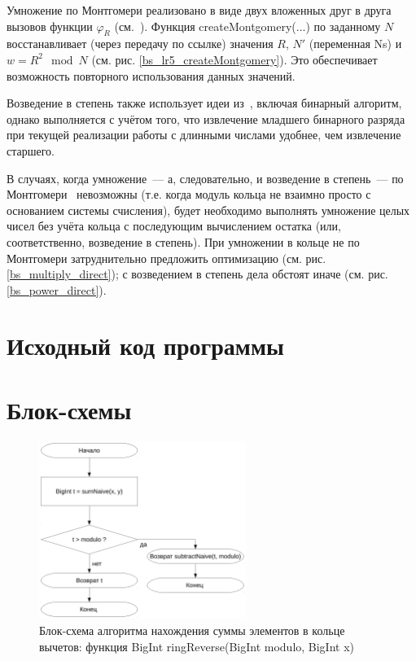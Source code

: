 \documentclass[a4paper,12pt]{article} %
\begin{document}
Умножение по Монтгомери реализовано в виде двух вложенных друг в друга вызовов функции $\varphi_R$
(см.~\cite{Glukhov}).
Функция createMontgomery(...) по заданному $N$
восстанавливает (через передачу по ссылке) значения $R$, $N'$ (переменная Ns) и $w = R^2 \mod N$
(см. рис. \ref{bs_lr5_createMontgomery}).
Это обеспечивает возможность повторного использования данных значений.

Возведение в степень также использует идеи из~\cite{Glukhov},
включая бинарный алгоритм, однако выполняется с учётом того,
что извлечение младшего бинарного разряда при текущей реализации
работы с длинными числами удобнее, чем извлечение старшего.

В случаях, когда умножение~--- а, следовательно, и возведение в степень~--- по Монтгомери~\cite{Glukhov}
невозможны (т.е. когда модуль кольца не взаимно просто с основанием системы счисления),
будет необходимо выполнять умножение целых чисел без учёта кольца с последующим вычислением остатка
(или, соответственно, возведение в степень).
При умножении в кольце не по Монтгомери затруднительно предложить оптимизацию (см. рис. \ref{bs_multiply_direct});
с возведением в степень дела обстоят иначе (см. рис. \ref{bs_power_direct}).

\section*{Исходный код программы}










\section*{Блок-схемы}


\begin{figure}[ht]
	\centering
	\includegraphics[width=0.6\textwidth]{lr5_sumRing.pdf}
	\caption{
		Блок-схема алгоритма нахождения суммы элементов в кольце вычетов:
		функция BigInt ringReverse(BigInt modulo, BigInt x)
	}
	\label{bs_plus}
\end{figure}
\end{document}
